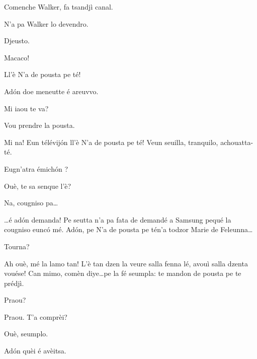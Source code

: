 \begin{drama}
\Vioupspeaks Comenche Walker, fa tsandjì canal.

\Vioujspeaks N'a pa Walker lo devendro.

\Vioupspeaks Djeusto.

\Vioujspeaks Macaco!

\Vioupspeaks Ll'è \og N'a de pousta pe té\fg!


\Vioujspeaks Ad\'on doe meneutte é areuvvo.

\Vioupspeaks Mi iaou te va?

\Vioujspeaks Vou prendre la pousta.

\Vioupspeaks Mi na! Eun télévij\'on ll'è \og N'a de pousta pe té\fg! Veun seuilla, tranquilo, achouatta-té.


\Vioujspeaks Eugn'atra émich\'on ?

\Vioupspeaks Ouè, te sa senque l'è?

\Vioujspeaks Na, cougniso pa\ldots

\Vioupspeaks \ldots é ad\'on demanda! Pe seutta n'a pa fata de demandé a Samsung pequé la cougniso eunc\'o mé. Ad\'on, pe \og N'a de pousta pe té\fg n'a todzor Marie de Feleunna\ldots

\Vioujspeaks Tourna?

\Vioupspeaks Ah ouè, mé la lamo tan! L'è tan dzen la veure salla fenna lé, avouì salla dzenta vouése! Can mimo, comèn diye\ldots pe la fé seumpla: te mandon de pousta pe te prédjì.

\Vioujspeaks Praou?

\Vioupspeaks Praou. T'a comprèi?

\Vioujspeaks Ouè, seumplo.

\Vioupspeaks Ad\'on quèi é avèitsa.



\scene[-- N'a de pousta pe té]

\label{pousta}
 


\end{drama}
